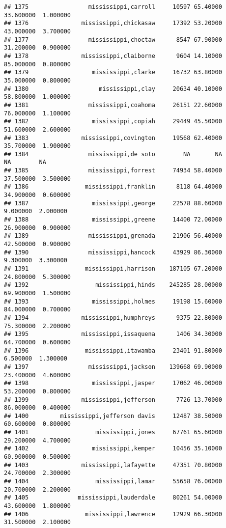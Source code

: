 \documentclass[
]{article}
\begin{document}
\begin{verbatim}
## 1375                 mississippi,carroll     10597 65.40000 33.600000  1.000000
## 1376               mississippi,chickasaw     17392 53.20000 43.000000  3.700000
## 1377                 mississippi,choctaw      8547 67.90000 31.200000  0.900000
## 1378               mississippi,claiborne      9604 14.10000 85.000000  0.800000
## 1379                  mississippi,clarke     16732 63.80000 35.000000  0.800000
## 1380                    mississippi,clay     20634 40.10000 58.800000  1.000000
## 1381                 mississippi,coahoma     26151 22.60000 76.000000  1.100000
## 1382                  mississippi,copiah     29449 45.50000 51.600000  2.600000
## 1383               mississippi,covington     19568 62.40000 35.700000  1.900000
## 1384                 mississippi,de soto        NA       NA        NA        NA
## 1385                 mississippi,forrest     74934 58.40000 37.500000  3.500000
## 1386                mississippi,franklin      8118 64.40000 34.900000  0.600000
## 1387                  mississippi,george     22578 88.60000  9.000000  2.000000
## 1388                  mississippi,greene     14400 72.00000 26.900000  0.900000
## 1389                 mississippi,grenada     21906 56.40000 42.500000  0.900000
## 1390                 mississippi,hancock     43929 86.30000  9.300000  3.300000
## 1391                mississippi,harrison    187105 67.20000 24.800000  5.300000
## 1392                   mississippi,hinds    245285 28.00000 69.900000  1.500000
## 1393                  mississippi,holmes     19198 15.60000 84.000000  0.700000
## 1394               mississippi,humphreys      9375 22.80000 75.300000  2.200000
## 1395               mississippi,issaquena      1406 34.30000 64.700000  0.600000
## 1396                mississippi,itawamba     23401 91.80000  6.500000  1.300000
## 1397                 mississippi,jackson    139668 69.90000 23.400000  4.600000
## 1398                  mississippi,jasper     17062 46.00000 53.200000  0.800000
## 1399               mississippi,jefferson      7726 13.70000 86.000000  0.400000
## 1400         mississippi,jefferson davis     12487 38.50000 60.600000  0.800000
## 1401                   mississippi,jones     67761 65.60000 29.200000  4.700000
## 1402                  mississippi,kemper     10456 35.10000 60.900000  0.500000
## 1403               mississippi,lafayette     47351 70.80000 24.700000  2.300000
## 1404                   mississippi,lamar     55658 76.00000 20.700000  2.200000
## 1405              mississippi,lauderdale     80261 54.00000 43.600000  1.800000
## 1406                mississippi,lawrence     12929 66.30000 31.500000  2.100000

\end{verbatim}
\end{document}
